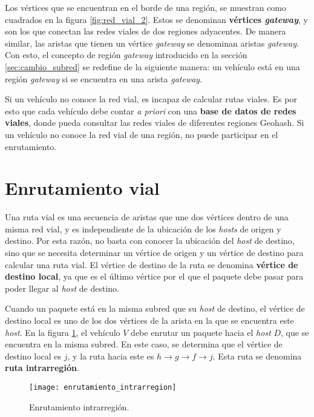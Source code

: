 Los vértices que se encuentran en el borde de una región, se muestran como
cuadrados en la figura \ref{fig:red_vial_2}. Estos se denominan \textbf{vértices
\textit{gateway}}, y son los que conectan las redes viales de dos regiones
adyacentes. De manera similar, las aristas que tienen un vértice
\textit{gateway} se denominan aristas \textit{gateway}. Con esto, el concepto
de región \textit{gateway} introducido en la sección \ref{sec:cambio_subred} se
redefine de la siguiente manera: un vehículo está en una región \textit{gateway}
si se encuentra en una arista \textit{gateway}.

Si un vehículo no conoce la red vial, es incapaz de calcular rutas viales. Es
por esto que cada vehículo debe contar \textit{a priori} con una \textbf{base de
datos de redes viales}, donde pueda consultar las redes viales de diferentes
regiones Geohash. Si un vehículo no conoce la red vial de una región, no puede
participar en el enrutamiento.

\section{Enrutamiento vial}
\label{sec:enrutamiento_vial}

Una ruta vial es una secuencia de aristas que une dos vértices dentro de una
misma red vial, y es independiente de la ubicación de los \textit{hosts} de
origen y destino. Por esta razón, no basta con conocer la ubicación del
\textit{host} de destino, sino que se necesita determinar un vértice de origen
y un vértice de destino para calcular una ruta vial. El vértice de destino de la
ruta se denomina \textbf{vértice de destino local}, ya que es el último vértice
por el que el paquete debe pasar para poder llegar al \textit{host} de destino.

Cuando un paquete está en la misma subred que su \textit{host} de destino, el
vértice de destino local es uno de los dos vértices de la arista en la que se
encuentra este \textit{host}. En la figura \ref{fig:enrutamiento_intrarregion},
el vehículo $V$ debe enrutar un paquete hacia el \textit{host} $D$, que se
encuentra en la misma subred. En este caso, se determina que el vértice de
destino local es $j$, y la ruta hacia este es $h \rightarrow g \rightarrow f
\rightarrow j$. Esta ruta se denomina \textbf{ruta intrarregión}.

\begin{figure}[th!]
\centering
\texttt{[image: enrutamiento\_intrarregion]}
\decoRule
\caption[Enrutamiento intrarregión]{Enrutamiento intrarregión.}
\label{fig:enrutamiento_intrarregion}
\end{figure}

